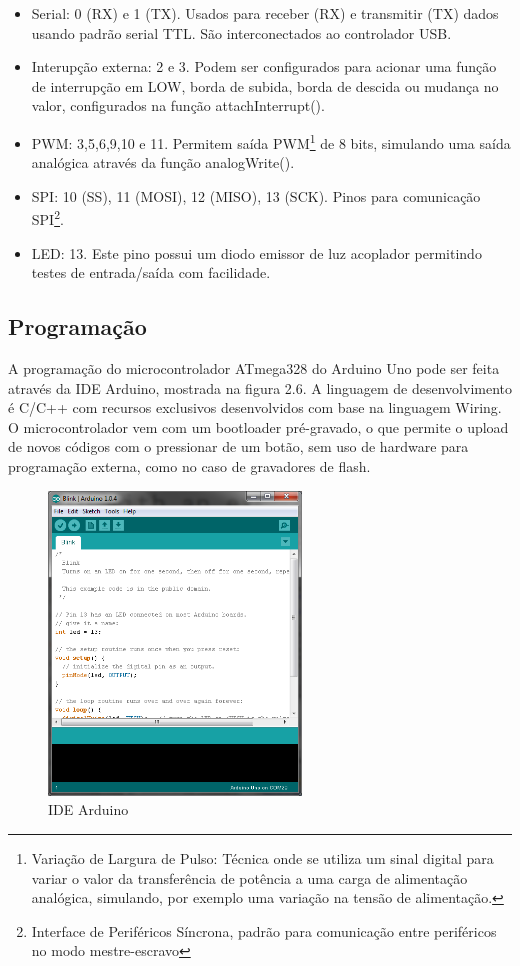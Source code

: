 \begin{itemize}
	\item Serial: 0 (RX) e 1 (TX). Usados para receber (RX) e transmitir (TX) dados usando padrão serial TTL. São interconectados ao controlador USB.
	\item Interupção externa: 2 e 3. Podem ser configurados para acionar uma função de interrupção em LOW, borda de subida, borda de descida ou mudança no valor, configurados na função attachInterrupt().
	\item PWM: 3,5,6,9,10 e 11. Permitem saída PWM\footnote{Variação de Largura de Pulso: Técnica onde se utiliza um sinal digital para variar o valor da transferência de potência a uma carga de alimentação analógica, simulando, por exemplo uma variação na tensão de alimentação.} de 8 bits, simulando uma saída analógica através da função analogWrite().
	\item SPI: 10 (SS), 11 (MOSI), 12 (MISO), 13 (SCK). Pinos para comunicação SPI\footnote{Interface de Periféricos Síncrona, padrão para comunicação entre periféricos no modo mestre-escravo}.
	\item LED: 13. Este pino possui um diodo emissor de luz acoplador permitindo testes de entrada/saída com facilidade.
\end{itemize} 

\subsection{Programação}

A programação do microcontrolador ATmega328 do Arduino Uno pode ser feita através da IDE Arduino, mostrada na figura 2.6. A linguagem de desenvolvimento é C/C++ com recursos exclusivos desenvolvidos com base na linguagem Wiring. O microcontrolador vem com um bootloader pré-gravado, o que permite o upload de novos códigos com o pressionar de um botão, sem uso de hardware para programação externa, como no caso de gravadores de flash.

\begin{figure}[h!]
			\centering
			\includegraphics[width=0.6\textwidth]{figures/ideArduino204.png}
			\caption{IDE Arduino}
			\label{1}
\end{figure}

